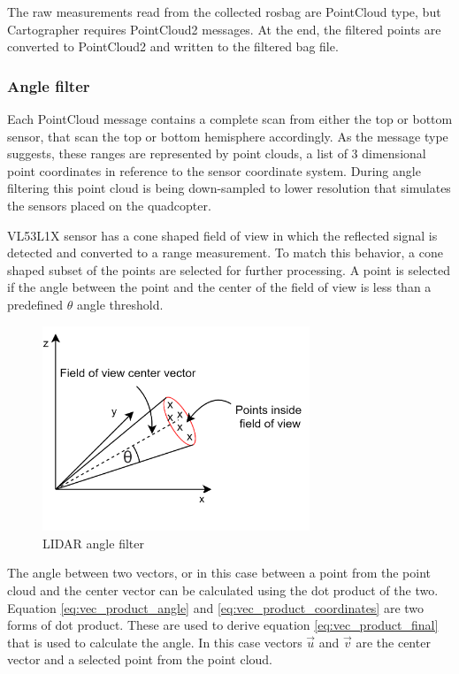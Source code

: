 The raw measurements read from the collected rosbag are PointCloud type, but Cartographer requires 
PointCloud2 messages. At the end, the filtered points are converted to PointCloud2 and written
to the filtered bag file. 

\subsubsection{Angle filter}
Each PointCloud message contains a complete scan from either the top or bottom sensor, that scan the 
top or bottom hemisphere accordingly. As the message type suggests, these ranges are represented by 
point clouds, a list of 3 dimensional point coordinates in reference to the sensor coordinate system. During 
angle filtering this point cloud is being down-sampled to lower resolution that simulates the sensors
placed on the quadcopter.

VL53L1X sensor has a cone shaped field of view in which the reflected signal is detected and converted to
a range measurement. To match this behavior, a cone shaped subset of the points are selected for further
processing. A point is selected if the angle between the point and the center of the field of view is less
than a predefined $\theta$ angle threshold.

\begin{figure}[!ht]
    \centering
    \includegraphics[width=80mm, keepaspectratio]{figures/data_angle_filter.png}
    \caption{LIDAR angle filter}
    \label{fig:data_angle_filter}
\end{figure}


The angle between two vectors, or in this case between a point from the point cloud and the center vector 
can be calculated using the dot product of the two. Equation \ref{eq:vec_product_angle} and 
\ref{eq:vec_product_coordinates} are two forms of dot product. These are used to derive equation 
\ref{eq:vec_product_final} that is used to calculate the angle. In this case vectors $\vec{u}$ and 
$\vec{v}$ are the center vector and a selected point from the point cloud. 


